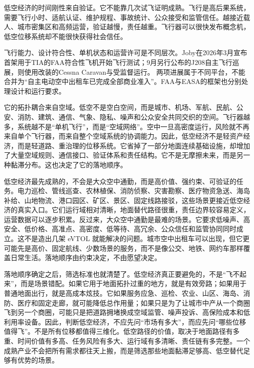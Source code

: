
低空经济的时间刚性来自验证。它不能靠几次试飞证明成熟。飞行是高后果系统，需要飞行小时、适航认证、维护规程、事故统计、公众接受和监管信任。越接近载人、城市密集区和高频运营，验证越慢，责任越重。飞行器可以很快发布概念机，低空位移系统却不能很快获得社会信任。

飞行能力、设计符合性、单机状态和运营许可是不同层次。Joby在2026年3月宣布首架用于TIA的FAA符合性飞机开始飞行测试；9月另行公布的J208自主飞行巡展，则使用改装的Cessna Caravan与受监督运行。\cite{joby2026conforming,joby2026j208} 两项进展属于不同平台，不能合并为“自主电动空中出租车已完成全部商业准入”。FAA与EASA的框架也分别处理设计和运行要求。\cite{faa2026aam,easa2026vtol}

它的拓扑耦合来自空域。低空不是空白空间，而是城市、机场、军航、民航、公安、消防、建筑、通信、气象、隐私、噪声和公众安全共同交织的空间。飞行器越多，系统越不是“单机飞行”，而是“空域网络”。空中一旦高密度运行，风险就不再来自单个飞行器，而来自整个空域系统的协调能力。因此，低空经济不是轻资产经济，而是轻道路、重治理的位移系统。它省掉了一部分地面连续基础设施，却增加了大量空域规则、通信接口、验证体系和责任结构。它不是无摩擦未来，而是另一种黏滞分布。这也决定了它的落地顺序。

低空经济最先成熟的，不会是大众空中通勤，而是高价值、强约束、可验证的任务。电力巡检、管线巡查、农林植保、消防侦察、灾害勘察、医疗物资急送、海岛补给、山地物流、港口园区、矿区、景区、固定线路接驳，这些场景更接近低空经济的真实入口。它们运行域相对清晰，地面替代路径很重，责任边界较容易定义，运营数据可以逐步积累。反过来，大众空中通勤是最难的场景。它要求低噪声、高安全、低价格、高准点、高密度、低等待、高冗余、公众信任和监管协同同时成立。这不是造出几架 eVTOL 就能解决的问题。城市空中出租车可以出现，但它更可能先是高价、固定航线、少数场景的服务，而不是像公交、地铁、网约车那样覆盖日常生活。落地顺序由约束决定，不由愿望决定。


落地顺序确定之后，筛选标准也就清楚了。低空经济真正要避免的，不是“飞不起来”，而是场景错配。如果它用于地面拓扑过重的地方，就是有效旁路；如果用于普通地面出行，就是高成本炫技。它如果服务应急、巡检、农业、山区、海岛、消防、医疗和固定走廊，就可能降低总作用量；如果只是为了让城市中产从一个商圈飞到另一个商圈，可能只是把道路拥堵换成空域监管、噪声投诉、高保险成本和低利用率设备。因此，判断低空经济，不应先问“市场有多大”，而应先问“哪些位移值得飞”。不是所有位移都值得三维化。低空路径的价值，取决于地面路径有多重、时间价值有多高、任务风险有多大、运行域有多清晰、责任链有多完整。一个成熟产业不会把所有需求都往天上搬，而是筛选那些地面黏滞足够高、低空替代足够有优势的场景。


